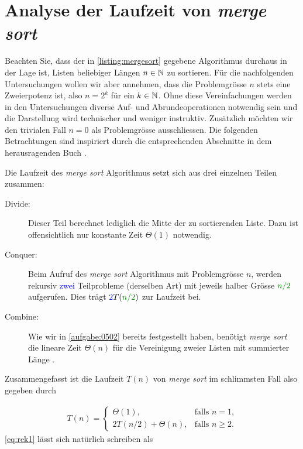 \section{Analyse der Laufzeit von \textit{merge sort}}
Beachten Sie, dass der in \cref{listing:mergesort} gegebene Algorithmus durchaus in der Lage ist, Listen beliebiger Längen $n\in\mathbb{N}$ zu sortieren. Für die nachfolgenden Untersuchungen wollen wir aber annehmen, dass die Problemgrösse $n$ stets eine Zweierpotenz ist, also $n = 2^k$ für ein $k\in\mathbb{N}$. Ohne diese Vereinfachungen werden in den Untersuchungen diverse Auf- und Abrundeoperationen notwendig sein und die Darstellung wird technischer und weniger instruktiv. Zusätzlich möchten wir den trivialen Fall $n = 0$ als Problemgrösse ausschliessen. Die folgenden Betrachtungen sind inspiriert durch die entsprechenden Abschnitte in dem herausragenden Buch \cite{IntroductionAlgo}.

Die Laufzeit des \textit{merge sort} Algorithmus setzt sich aus drei einzelnen Teilen zusammen:
\begin{description}
  \item[Divide:] Dieser Teil berechnet lediglich die Mitte der zu sortierenden Liste. Dazu ist offensichtlich nur konstante Zeit $\Theta(1)$ notwendig.
  \item[Conquer:] Beim Aufruf des \textit{merge sort} Algorithmus mit Problemgrösse $n$, werden rekursiv \textcolor{Blue}{zwei} Teilprobleme (derselben Art) mit jeweils halber Grösse $\textcolor{Green}{n/2}$ aufgerufen. Dies trägt $\textcolor{Blue}{2}T(\textcolor{Green}{n/2})$ zur Laufzeit bei.
  \item[Combine:] Wie wir in \cref{aufgabe:0502} bereits festgestellt haben, benötigt \textit{merge sort} die lineare Zeit $\Theta(n)$ für die Vereinigung zweier Listen mit summierter Länge .
\end{description}
Zusammengefasst ist die Laufzeit $T(n)$ von \textit{merge sort} im schlimmsten Fall also gegeben durch

\begin{align}\label{eq:rek1}
  T(n) = 
  \begin{cases}
    \Theta(1), &\text{falls $n = 1$,} \\
    2T(n/2) + \Theta(n), & \text{falls $n\geq 2$}.
  \end{cases}
\end{align}
\cref{eq:rek1} lässt sich natürlich schreiben als

